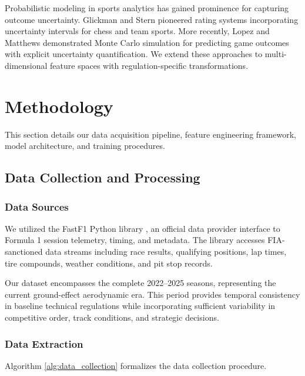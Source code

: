 \documentclass[conference]{IEEEtran}
\begin{document}
Probabilistic modeling in sports analytics has gained prominence for capturing outcome uncertainty. Glickman and Stern \cite{glickman1998} pioneered rating systems incorporating uncertainty intervals for chess and team sports. More recently, Lopez and Matthews \cite{lopez2015} demonstrated Monte Carlo simulation for predicting game outcomes with explicit uncertainty quantification. We extend these approaches to multi-dimensional feature spaces with regulation-specific transformations.

\section{Methodology}

This section details our data acquisition pipeline, feature engineering framework, model architecture, and training procedures.

\subsection{Data Collection and Processing}

\subsubsection{Data Sources}

We utilized the FastF1 Python library \cite{fastf1}, an official data provider interface to Formula 1 session telemetry, timing, and metadata. The library accesses FIA-sanctioned data streams including race results, qualifying positions, lap times, tire compounds, weather conditions, and pit stop records.

Our dataset encompasses the complete 2022--2025 seasons, representing the current ground-effect aerodynamic era. This period provides temporal consistency in baseline technical regulations while incorporating sufficient variability in competitive order, track conditions, and strategic decisions.

\subsubsection{Data Extraction}

Algorithm \ref{alg:data_collection} formalizes the data collection procedure.
\end{document}
